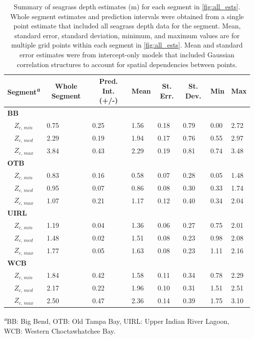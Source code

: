 \documentclass[letterpaper,12pt,oneside]{article}\usepackage[]{graphicx}\usepackage[]{color}
\begin{document}
\begin{table}[!tbp]
\caption{Summary of seagrass depth estimates (m) for each segment in \cref{fig:all_ests}.  Whole segment estimates and prediction intervals were obtained from a single point estimate that included all seagrass depth data for the segment. Mean, standard error, standard deviation, minimum, and maximum values are for multiple grid points within each segment in \cref{fig:all_ests}.  Mean and standard error estimates were from intercept-only models that included Gaussian correlation structures to account for spatial dependencies between points.\label{tab:est_summ}} 
\begin{center}
\begin{tabular}{llllllll}
\hline\hline
\multicolumn{1}{l}{{\bf Segment\textsuperscript{\textit{a}}}}&\multicolumn{1}{c}{Whole Segment}&\multicolumn{1}{c}{Pred. Int. (+/-)}&\multicolumn{1}{c}{Mean}&\multicolumn{1}{c}{St. Err.}&\multicolumn{1}{c}{St. Dev.}&\multicolumn{1}{c}{Min}&\multicolumn{1}{c}{Max}\tabularnewline
\hline
{\bfseries BB}&&&&&&&\tabularnewline
~~$Z_{c,\,min}$&0.75&0.25&1.56&0.18&0.79&0.00&2.72\tabularnewline
~~$Z_{c,\,med}$&2.29&0.19&1.94&0.17&0.76&0.55&2.97\tabularnewline
~~$Z_{c,\,max}$&3.84&0.43&2.29&0.19&0.81&0.74&3.48\tabularnewline
\hline
{\bfseries OTB}&&&&&&&\tabularnewline
~~$Z_{c,\,min}$&0.83&0.16&0.58&0.07&0.28&0.05&1.48\tabularnewline
~~$Z_{c,\,med}$&0.95&0.07&0.86&0.08&0.30&0.33&1.74\tabularnewline
~~$Z_{c,\,max}$&1.07&0.21&1.17&0.12&0.40&0.34&2.04\tabularnewline
\hline
{\bfseries UIRL}&&&&&&&\tabularnewline
~~$Z_{c,\,min}$&1.19&0.04&1.36&0.06&0.27&0.75&2.01\tabularnewline
~~$Z_{c,\,med}$&1.48&0.02&1.51&0.08&0.23&0.98&2.08\tabularnewline
~~$Z_{c,\,max}$&1.77&0.05&1.63&0.08&0.23&1.11&2.16\tabularnewline
\hline
{\bfseries WCB}&&&&&&&\tabularnewline
~~$Z_{c,\,min}$&1.84&0.42&1.58&0.11&0.34&0.78&2.29\tabularnewline
~~$Z_{c,\,med}$&2.17&0.22&1.96&0.10&0.31&1.51&2.51\tabularnewline
~~$Z_{c,\,max}$&2.50&0.47&2.36&0.14&0.39&1.75&3.10\tabularnewline
\hline
\end{tabular}\end{center}

\textsuperscript{\textit{a}}\footnotesize BB: Big Bend, OTB: Old Tampa Bay, UIRL: Upper Indian River Lagoon, WCB: Western Choctawhatchee Bay.\end{table}
\end{document}
